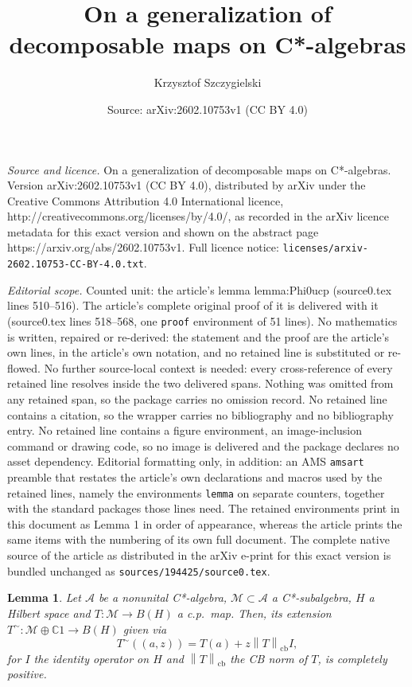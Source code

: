 \documentclass[10pt,a4paper]{amsart}
\title{On a generalization of decomposable maps on C*-algebras}
\author{Krzysztof Szczygielski}
\date{Source: arXiv:2602.10753v1 (CC BY 4.0)}
\newtheorem{lemma}{Lemma}
\newcommand{\cbnorm}[1]{\left\| #1 \right\|_{\mathrm{cb}}}
\newcommand{\complexes}{\mathbb{C}}
\begin{document}
\maketitle

\noindent\emph{Source and licence.} On a generalization of decomposable maps on C*-algebras. Version arXiv:2602.10753v1 (CC BY 4.0), distributed by arXiv under the Creative Commons Attribution 4.0 International licence, http://creativecommons.org/licenses/by/4.0/, as recorded in the arXiv licence metadata for this exact version and shown on the abstract page https://arxiv.org/abs/2602.10753v1. Full licence notice: \texttt{licenses/arxiv-2602.10753-CC-BY-4.0.txt}.\par\smallskip

\noindent\textit{Editorial scope.} Counted unit: the article's lemma lemma:Phi0ucp (source0.tex lines 510--516). The article's complete original proof of it is delivered with it (source0.tex lines 518--568, one \texttt{proof} environment of 51 lines). No mathematics is written, repaired or re-derived: the statement and the proof are the article's own lines, in the article's own notation, and no retained line is substituted or re-flowed.  No further source-local context is needed: every cross-reference of every retained line resolves inside the two delivered spans.  Nothing was omitted from any retained span, so the package carries no omission record.  No retained line contains a citation, so the wrapper carries no bibliography and no bibliography entry.  No retained line contains a figure environment, an image-inclusion command or drawing code, so no image is delivered and the package declares no asset dependency.  Editorial formatting only, in addition: an AMS \texttt{amsart} preamble that restates the article's own declarations and macros used by the retained lines, namely the environments \texttt{lemma} on separate counters, together with the standard packages those lines need.  The retained environments print in this document as Lemma 1 in order of appearance, whereas the article prints the same items with the numbering of its own full document.  The complete native source of the article as distributed in the arXiv e-print for this exact version is bundled unchanged as \texttt{sources/194425/source0.tex}.
\begin{lemma}\label{lemma:Phi0ucp}
    Let $\mathscr{A}$ be a nonunital C*-algebra, $\mathscr{M} \subset \mathscr{A}$ a C*-subalgebra, $H$ a Hilbert space and $T : \mathscr{M}\to B(H)$ a c.p.~map. Then, its extension $T^\sim : \mathscr{M} \oplus \complexes 1 \to B(H)$ given via
    \begin{equation}
        T^\sim ((a,z)) = T(a) + z \cbnorm{T} I,
    \end{equation}
    for $I$ the identity operator on $H$ and $\cbnorm{T}$ the CB norm of $T$, is completely positive.
\end{lemma}
\end{document}
